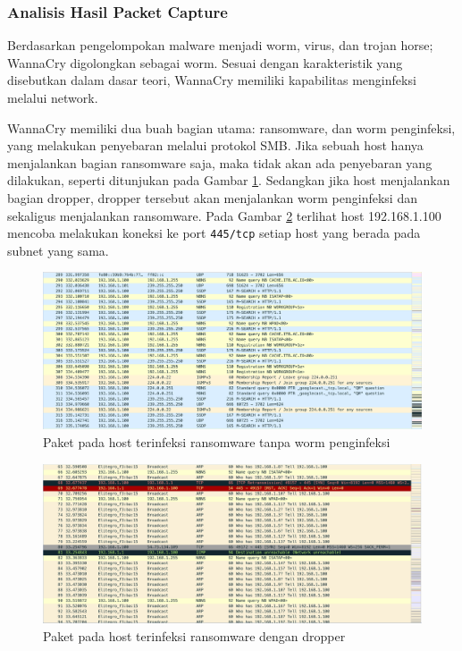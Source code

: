 \subsubsection{Analisis Hasil Packet Capture}

Berdasarkan pengelompokan malware menjadi worm, virus, dan trojan horse; WannaCry digolongkan sebagai worm. Sesuai dengan karakteristik yang disebutkan dalam dasar teori, WannaCry memiliki kapabilitas menginfeksi melalui network.

WannaCry memiliki dua buah bagian utama: ransomware, dan worm penginfeksi, yang melakukan penyebaran melalui protokol SMB. Jika sebuah host hanya menjalankan bagian ransomware saja, maka tidak akan ada penyebaran yang dilakukan, seperti ditunjukan pada Gambar \ref{fig:no_infect_action}. Sedangkan jika host menjalankan bagian dropper, dropper tersebut akan menjalankan worm penginfeksi dan sekaligus menjalankan ransomware. Pada Gambar \ref{fig:infect_action} terlihat host 192.168.1.100  mencoba melakukan koneksi ke port \verb|445/tcp| setiap host yang berada pada subnet yang sama.

\begin{figure}[H]
	\centering
	\includegraphics[width=\textwidth]{resources/no_infect_action.png}
	\caption{Paket pada host terinfeksi ransomware tanpa worm penginfeksi}
	\label{fig:no_infect_action}
\end{figure}

\begin{figure}[H]
	\centering
	\includegraphics[width=\textwidth]{resources/infect_action.png}
	\caption{Paket pada host terinfeksi ransomware dengan dropper}
	\label{fig:infect_action}
\end{figure}

